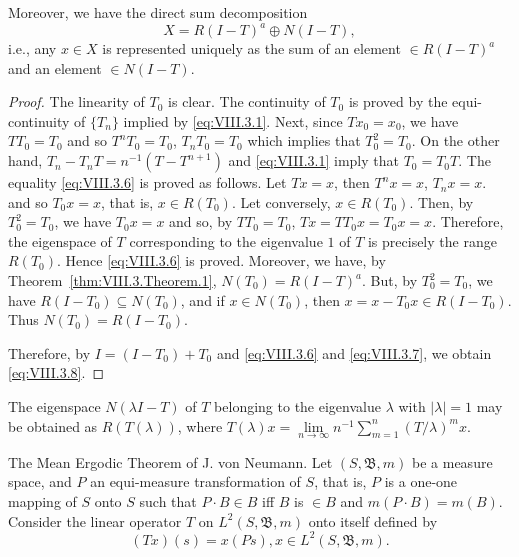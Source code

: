 Moreover, we have the direct sum decomposition 
\begin{equation}\label{eq:VIII.3.8}
X = R (I - T) ^{a} \oplus N (I - T),
\end{equation}
i.e., any $x \in X$ is represented uniquely as the sum of an element $\in R(I - T)^a$ and an element $\in N(I - T)$. 

\begin{proof}
 The linearity of $T_0$ is clear. The continuity of $T_0$ is proved by the equi-continuity of $\{T_n\}$ implied by \eqref{eq:VIII.3.1}. Next, since $Tx_0 = x_0$, we have $TT_0 = T_0$ and so $T^n T_0 = T_0$, $T_n T_0 = T_0$ which implies that $T_0^2 = T_0$. On the other hand, $T_n - T_n T = n^{-1}(T - T^{n+1})$ and \eqref{eq:VIII.3.1} imply that $T_0 = T_0 T$. The equality \eqref{eq:VIII.3.6} is proved as follows. Let $Tx = x$, then $T^n x = x$, $T_n x = x$. and so $T_0 x = x$, that is, $x \in R(T_0)$. Let conversely, $x \in R(T_0)$. Then, by $T_0^2 = T_0$, we have $T_0 x = x$ and so, by $TT_0 = T_0$, $Tx = TT_0 x = T_0 x = x$. Therefore, the eigenspace of $T$ corresponding to the eigenvalue $1$ of $T$ is precisely the range $R(T_0)$. Hence \eqref{eq:VIII.3.6} is proved. Moreover, we have, by Theorem~\ref{thm:VIII.3.Theorem.1}, $N(T_0) = R(I - T)^a$. But, by $T_0^2 = T_0$, we have $R(I - T_0) \subseteq N(T_0)$, and if $x \in N(T_0)$, then $x = x - T_0 x \in R(I - T_0)$. Thus $N(T_0) = R(I - T_0)$. 

Therefore, by $I = (I - T_0) + T_0$ and \eqref{eq:VIII.3.6} and \eqref{eq:VIII.3.7}, we obtain \eqref{eq:VIII.3.8}. 
\end{proof}

\begin{remarku} The eigenspace $N(\lambda I - T)$ of $T$ belonging to the eigenvalue $\lambda$ with $|\lambda| = 1$ may be obtained as $R(T(\lambda))$, where $T(\lambda)x = \lim\limits_{n\to \infty}n^{-1}\sum\limits_{m=1}^{n}(T / \lambda)^m x$. 
\end{remarku}

The Mean Ergodic Theorem of J. von Neumann. Let $(S, \mathfrak{B}, m)$ be a measure space, and $P$ an equi-measure transformation of $S$, that is, $P$ is a one-one mapping of $S$ onto $S$ such that $P \cdot B \in B$ iff $B$ is $\in B$ and $m(P \cdot B) = m(B)$. Consider the linear operator $T$ on $L^{2}(S, \mathfrak{B}, m)$ onto itself defined by 
\begin{equation}\label{eq:VIII.3.9}
(T x) (s) = x (P s), x \in L ^{2} (S, \mathfrak {B}, m).
\end{equation}

